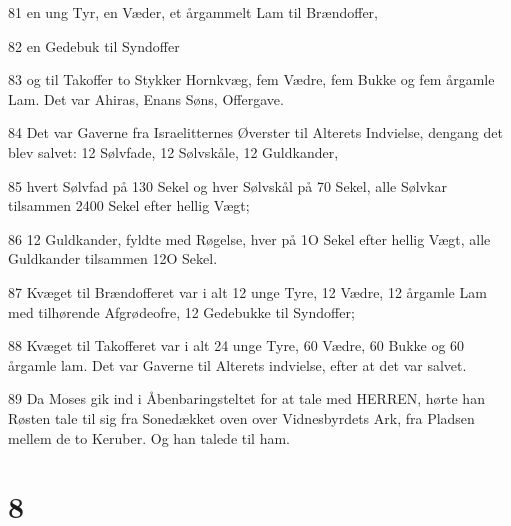 \par 81 en ung Tyr, en Væder, et årgammelt Lam til Brændoffer,
\par 82 en Gedebuk til Syndoffer
\par 83 og til Takoffer to Stykker Hornkvæg, fem Vædre, fem Bukke og fem årgamle Lam. Det var Ahiras, Enans Søns, Offergave.
\par 84 Det var Gaverne fra Israelitternes Øverster til Alterets Indvielse, dengang det blev salvet: 12 Sølvfade, 12 Sølvskåle, 12 Guldkander,
\par 85 hvert Sølvfad på 130 Sekel og hver Sølvskål på 70 Sekel, alle Sølvkar tilsammen 2400 Sekel efter hellig Vægt;
\par 86 12 Guldkander, fyldte med Røgelse, hver på 1O Sekel efter hellig Vægt, alle Guldkander tilsammen 12O Sekel.
\par 87 Kvæget til Brændofferet var i alt 12 unge Tyre, 12 Vædre, 12 årgamle Lam med tilhørende Afgrødeofre, 12 Gedebukke til Syndoffer;
\par 88 Kvæget til Takofferet var i alt 24 unge Tyre, 60 Vædre, 60 Bukke og 60 årgamle lam. Det var Gaverne til Alterets indvielse, efter at det var salvet.
\par 89 Da Moses gik ind i Åbenbaringsteltet for at tale med HERREN, hørte han Røsten tale til sig fra Sonedækket oven over Vidnesbyrdets Ark, fra Pladsen mellem de to Keruber. Og han talede til ham.

\chapter{8}

